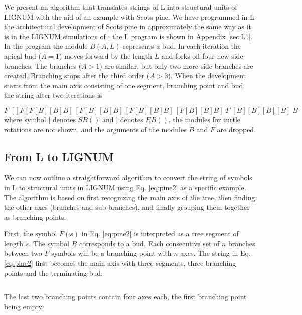 We present an  algorithm that translates strings of  L into structural
units of LIGNUM  with the aid of an example with  Scots pine.  We have
programmed  in  L  the  architectural  development of  Scots  pine  in
approximately  the same  way as  it is  in the  LIGNUM  simulations of
\citet{perttunen:96, perttunen:98}; the L program is shown in Appendix
\ref{sec:L1}.  In the program the module $B(A,L)$ represents a bud. In
each iteration  the apical bud ($A  = 1$) moves forward  by the length
$L$ and forks off four new  side branches.  The branches ($A > 1$) are
similar, but only two more side branches are created.  Branching stops
after the third order ($A > 3$).  When the development starts from the
main  axis consisting  of one  segment, branching  point and  bud, the
string after two iterations is

\begin{equation}\label{eq:pine2}
F\;[] F [F[B][B]B]\:[F[B][B]B]\:[F[B][B]B]\:[F[B][B]B]\; F \;[B][B][B][B]\; B
\end{equation}
where symbol  [ denotes $SB()$ and  ] denotes $EB()$,  the modules for
turtle rotations are  not shown, and the arguments  of the modules $B$
and $F$ are dropped.

\subsection{From L to LIGNUM}\label{sec:LToLignum}

We can now  outline a straightforward algorithm to  convert the string
of symbols in L to structural units in LIGNUM using Eq. \ref{eq:pine2}
as a  specific example.  The  algorithm is based on  first recognizing
the main axis  of the tree, then finding the  other axes (branches and
sub-branches), and finally grouping them together as branching points.

First, the  symbol $F(s)$ in  Eq.  \ref{eq:pine2} is interpreted  as a
tree  segment of length  $s$.  The  symbol $B$  corresponds to  a bud.
Each consecutive set of $n$ branches between two $F$ symbols will be a
branching  point with  $n$ axes.   The string  in  Eq.  \ref{eq:pine2}
first  becomes the  main  axis with  three  segments, three  branching
points and the terminating bud:

\begin{equation}
[TS, BP, TS, BP, TS, BP, B]
\end{equation}

The  last two  branching  points  contain four  axes  each, the  first
branching point being empty:


